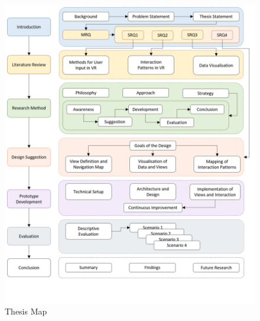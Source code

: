 \begin{figure}[ht]
	\begin{center}
		\includegraphics[width=14cm]{03_Figures/06_Introduction/ThesisMap.png}
		\caption{Thesis Map}
		\label{fig:thesismap}
	\end{center}
\end{figure}






